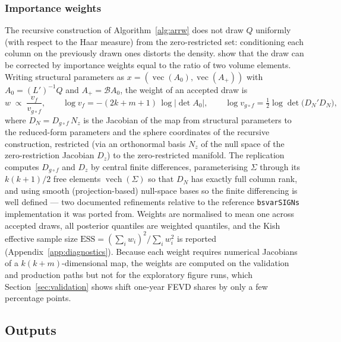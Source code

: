 \subsubsection{Importance weights}

The recursive construction of Algorithm~\ref{alg:arrw} does not draw $Q$ uniformly (with respect to the Haar measure) from the zero-restricted set: conditioning each column on the previously drawn ones distorts the density. \citet{arias2018} show that the draw can be corrected by importance weights equal to the ratio of two volume elements. Writing structural parameters as $x = (\operatorname{vec}(A_0), \operatorname{vec}(A_+))$ with $A_0 = (L')^{-1} Q$ and $A_+ = \mathcal{B} A_0$, the weight of an accepted draw is
\begin{equation}
w \;\propto\; \frac{v_{f}}{v_{g\circ f}}, \qquad
\log v_{f} = -(2k + m + 1)\, \log \lvert \det A_0 \rvert, \qquad
\log v_{g \circ f} = \tfrac{1}{2} \log \det \big( D_N' D_N \big),
\label{eq:weight}
\end{equation}
where $D_N = D_{g \circ f}\, N_z$ is the Jacobian of the map from structural parameters to the reduced-form parameters and the sphere coordinates of the recursive construction, restricted (via an orthonormal basis $N_z$ of the null space of the zero-restriction Jacobian $D_z$) to the zero-restricted manifold. The replication computes $D_{g\circ f}$ and $D_z$ by central finite differences, parameterising $\Sigma$ through its $k(k+1)/2$ free elements $\operatorname{vech}(\Sigma)$ so that $D_N$ has exactly full column rank, and using smooth (projection-based) null-space bases so the finite differencing is well defined --- two documented refinements relative to the reference \texttt{bsvarSIGNs} implementation it was ported from. Weights are normalised to mean one across accepted draws, all posterior quantiles are weighted quantiles, and the Kish effective sample size $\mathrm{ESS} = (\sum_i w_i)^2 / \sum_i w_i^2$ is reported (Appendix~\ref{app:diagnostics}). Because each weight requires numerical Jacobians of a $k(k+m)$-dimensional map, the weights are computed on the validation and production paths but not for the exploratory figure runs, which Section~\ref{sec:validation} shows shift one-year FEVD shares by only a few percentage points.

\subsection{Outputs}
\label{sec:outputs}

